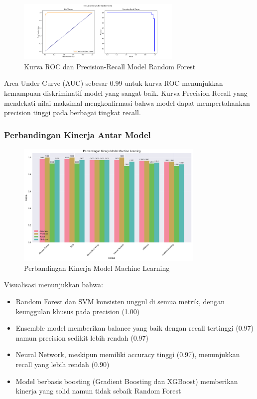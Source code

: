 \begin{figure}[htbp]
    \centering
    \includegraphics[width=0.7\textwidth]{figures/curves_Random Forest.png}
    \caption{Kurva ROC dan Precision-Recall Model Random Forest}
    \label{fig:rocPRCurves}
\end{figure}

Area Under Curve (AUC) sebesar 0.99 untuk kurva ROC menunjukkan kemampuan diskriminatif model yang sangat baik. Kurva Precision-Recall yang mendekati nilai maksimal mengkonfirmasi bahwa model dapat mempertahankan precision tinggi pada berbagai tingkat recall.

\subsubsection{Perbandingan Kinerja Antar Model}

\begin{figure}[htbp]
    \centering
    \includegraphics[width=0.8\textwidth]{figures/model_performance_comparison.pdf}
    \caption{Perbandingan Kinerja Model Machine Learning}
    \label{fig:modelComparison}
\end{figure}

Visualisasi menunjukkan bahwa:
\begin{itemize}
    \item Random Forest dan SVM konsisten unggul di semua metrik, dengan keunggulan khusus pada precision (1.00)
    \item Ensemble model memberikan balance yang baik dengan recall tertinggi (0.97) namun precision sedikit lebih rendah (0.97)
    \item Neural Network, meskipun memiliki accuracy tinggi (0.97), menunjukkan recall yang lebih rendah (0.90)
    \item Model berbasis boosting (Gradient Boosting dan XGBoost) memberikan kinerja yang solid namun tidak sebaik Random Forest
\end{itemize}

